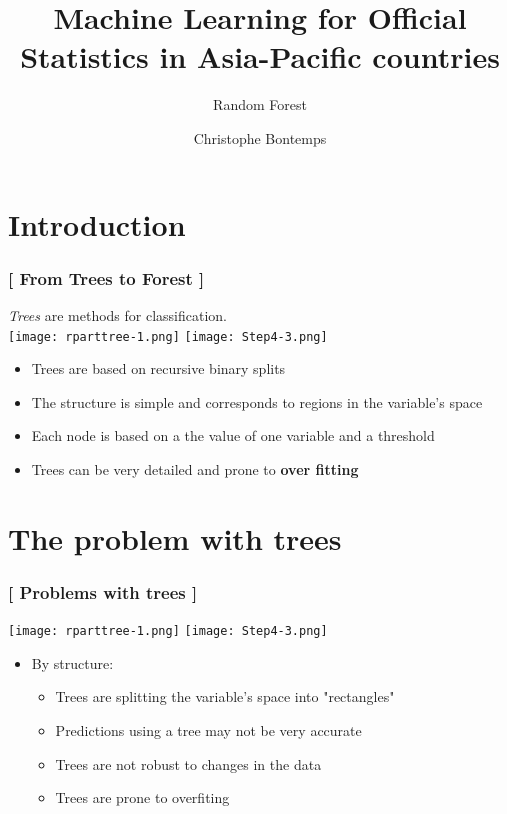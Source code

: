 \documentclass[xcolor=x11names,compress]{beamer}
\title{\textcolor{siap}{Machine Learning for Official Statistics in Asia-Pacific countries \\ \vspace{0.5cm} }}
\subtitle{\textcolor{brique}{\Large{Random Forest}}}
\author{\textcolor{siap}{Christophe Bontemps}}
\institute{ \texttt{[image: SIAP\_logo\_Big.png]}}
\date{}
\renewcommand{\(}{\begin{columns}}
\renewcommand{\)}{\end{columns}}
\newcommand{\<}[1]{\begin{column}{#1}}
\renewcommand{\>}{\end{column}}
\begin{document}
\begin{frame}
  \titlepage
\end{frame}


\section{Introduction}


\begin{frame} %
\frametitle{\textcolor{brique}{[  From Trees to Forest  ]}}
\textit{Trees} are methods for classification.\\
 \texttt{[image: rparttree-1.png]} \texttt{[image: Step4-3.png]}
\pause
\begin{itemize}[<+->]
  \item Trees are based on  recursive binary splits
  \item The structure is simple and corresponds to regions in the variable's space
  \item Each node is based on a the value of one variable  and a threshold
  \item Trees can be very detailed and prone to \textbf{over fitting}
\end{itemize}
\end{frame}


\section{The problem with trees}

\begin{frame} %
\frametitle{\textcolor{brique}{[ Problems with  trees ]}}
 \texttt{[image: rparttree-1.png]} \texttt{[image: Step4-3.png]}
\pause
\begin{itemize}
  \item[] By structure:
  \begin{itemize}[<+->]
    \item Trees are splitting the variable's space into "rectangles"
    \item Predictions using a tree may not be  very accurate
    \item Trees are not robust to changes in the data
    \item  Trees are prone to overfiting
  \end{itemize}
\end{itemize}
\end{frame}
\end{document}

